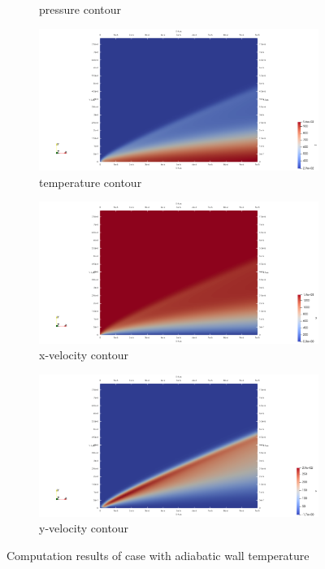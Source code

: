 \documentclass[conf]{new-aiaa}
\begin{document}
\begin{figure}[!htb]
\begin{subfigure}{0.45\textwidth}
        \caption{pressure contour}
    \end{subfigure}
    \hfill
    \begin{subfigure}{0.45\textwidth}
        \includegraphics[width=\textwidth]{supportingFiles/solution_files_flatplate_adiabaticWall/temperature.png}
        \caption{temperature contour}
    \end{subfigure}
    \hfill
    \begin{subfigure}{0.45\textwidth}
        \includegraphics[width=\textwidth]{supportingFiles/solution_files_flatplate_adiabaticWall/u_velocity.png}
        \caption{x-velocity contour}
    \end{subfigure}
    \hfill
    \begin{subfigure}{0.45\textwidth}
        \includegraphics[width=\textwidth]{supportingFiles/solution_files_flatplate_adiabaticWall/v_velocity.png}
        \caption{y-velocity contour}
    \end{subfigure}
    \caption{Computation results of case with adiabatic wall temperature}
    \label{results_Wa}
\end{figure}
\end{document}
